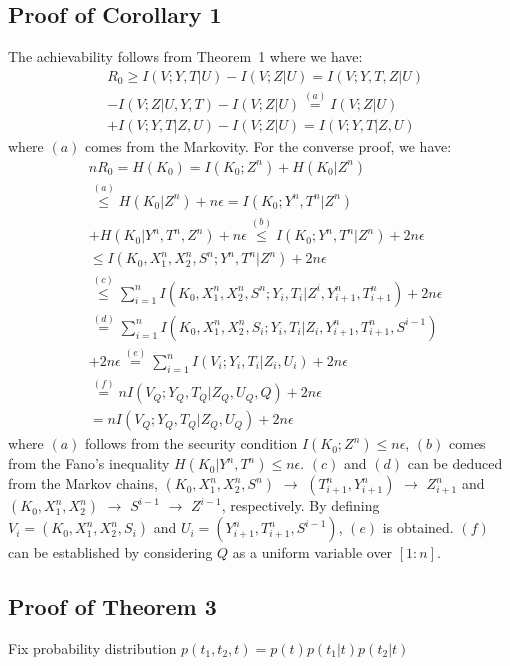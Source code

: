 \documentclass[conference,8pt]{IEEEtran}
\begin{document}
{{{{\subsection{Proof of Corollary 1}\label{sec:sec53}{
The achievability follows from Theorem~1 where we have:
\begin{align}
&R_0 \geq I(V;Y,T|U)-I(V;Z|U)=I(V;Y,T,Z|U) \nonumber \\
&-I(V;Z|U,Y,T)-I(V;Z|U)\stackrel{(a)}{=}I(V;Z|U) \nonumber \\
&+I(V;Y,T|Z,U)-I(V;Z|U)=I(V;Y,T|Z,U)
\end{align}
where $(a)$ comes from the Markovity. For the converse proof, we have:
\begin{align}
&nR_0=H(K_0)=I(K_0;Z^n)+H(K_0|Z^n) \nonumber \\
& \stackrel{(a)}{\leq} H(K_0|Z^n)+n\epsilon = I(K_0;Y^n,T^n|Z^n) \nonumber \\
&+H(K_0|Y^n,T^n,Z^n)+n\epsilon \stackrel{(b)}{\leq} I(K_0;Y^n,T^n|Z^n)+2n\epsilon \nonumber \\
& \leq I(K_0,X^n_1,X^n_2,S^n;Y^n,T^n|Z^n)+2n\epsilon \nonumber \\
& \stackrel{(c)}{\leq} \sum_{i=1}^n I(K_0,X^n_1,X^n_2,S^n;Y_i,T_i|Z^i,Y^n_{i+1},T^n_{i+1})+2n\epsilon \nonumber \\
& \stackrel{(d)}{=} \sum_{i=1}^n I(K_0,X^n_1,X^n_2,S_i;Y_i,T_i|Z_i,Y^n_{i+1},T^n_{i+1},S^{i-1}) \nonumber \\
&+2n\epsilon \stackrel{(e)}{=} \sum_{i=1}^n I(V_i;Y_i,T_i|Z_i,U_i)+2n\epsilon \nonumber \\
&\stackrel{(f)}{=}nI(V_Q;Y_Q,T_Q|Z_Q,U_Q,Q)+2n\epsilon \nonumber \\
&=nI(V_Q;Y_Q,T_Q|Z_Q,U_Q)+2n\epsilon
\end{align}
where $(a)$ follows from the security condition $I(K_0;Z^n) \leq n\epsilon$, $(b)$ comes from the Fano's inequality $H(K_0|Y^n,T^n) \leq n\epsilon$. $(c)$ and $(d)$ can be deduced from the Markov chains, $(K_0,X^n_1,X^n_2,S^n)$ $\rightarrow$ $(T^n_{i+1},Y^n_{i+1})$ $\rightarrow$ $Z^n_{i+1}$ and $(K_0,X^n_1,X^n_2)$ $\rightarrow$ $S^{i-1}$ $\rightarrow$ $Z^{i-1}$, respectively. By defining $V_i=(K_0,X^n_1,X^n_2,S_i)$ and $U_i=(Y^n_{i+1},T^n_{i+1},S^{i-1})$, $(e)$ is obtained. $(f)$ can be established by considering $Q$ as a uniform variable over $[1:n]$.
\subsection{Proof of Theorem 3}\label{sec:sec54}{
Fix probability distribution $p(t_1,t_2,t)= p(t)p(t_1|t)p(t_2|t)$ 

}}}}}}
\end{document}
